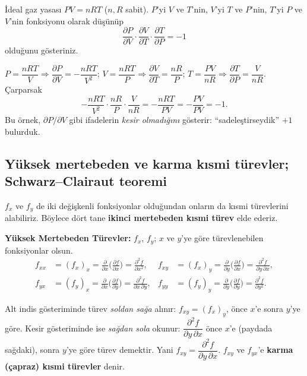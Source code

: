 \begin{soru}
İdeal gaz yasası $PV=nRT$ ($n,R$ sabit). $P$'yi $V$ ve $T$'nin, $V$'yi $T$ ve $P$'nin, $T$'yi $P$ ve $V$'nin fonksiyonu
olarak düşünüp
\[ \frac{\partial P}{\partial V}\cdot\frac{\partial V}{\partial T}\cdot\frac{\partial T}{\partial P}=-1 \]
olduğunu gösteriniz.
\end{soru}
\begin{cevap}
$P=\dfrac{nRT}{V}\Rightarrow \dfrac{\partial P}{\partial V}=-\dfrac{nRT}{V^2}$;\quad
$V=\dfrac{nRT}{P}\Rightarrow \dfrac{\partial V}{\partial T}=\dfrac{nR}{P}$;\quad
$T=\dfrac{PV}{nR}\Rightarrow \dfrac{\partial T}{\partial P}=\dfrac{V}{nR}$. Çarparsak
\[
-\frac{nRT}{V^2}\cdot\frac{nR}{P}\cdot\frac{V}{nR}=-\frac{nRT}{PV}=-\frac{PV}{PV}=-1 .
\]
Bu örnek, $\partial P/\partial V$ gibi ifadelerin \emph{kesir olmadığını} gösterir: ``sadeleştirseydik'' $+1$ bulurduk.
\end{cevap}

\subsection{Yüksek mertebeden ve karma kısmi türevler; Schwarz--Clairaut teoremi}

$f_x$ ve $f_y$ de iki değişkenli fonksiyonlar olduğundan onların da kısmi türevlerini alabiliriz. Böylece dört tane
\textbf{ikinci mertebeden kısmi türev} elde ederiz.

\begin{tahta}
\textbf{Yüksek Mertebeden Türevler:} $f_x$, $f_y$; $x$ ve $y$'ye göre türevlenebilen fonksiyonlar olsun.
\begin{align*}
f_{xx}&=(f_x)_x=\frac{\partial}{\partial x}\Big(\frac{\partial f}{\partial x}\Big)=\frac{\partial^2f}{\partial x^2}, &
f_{xy}&=(f_x)_y=\frac{\partial}{\partial y}\Big(\frac{\partial f}{\partial x}\Big)=\frac{\partial^2f}{\partial y\,\partial x},\\
f_{yx}&=(f_y)_x=\frac{\partial}{\partial x}\Big(\frac{\partial f}{\partial y}\Big)=\frac{\partial^2f}{\partial x\,\partial y}, &
f_{yy}&=(f_y)_y=\frac{\partial}{\partial y}\Big(\frac{\partial f}{\partial y}\Big)=\frac{\partial^2f}{\partial y^2}.
\end{align*}
\end{tahta}

\begin{dikkat}
Alt indis gösteriminde türev \emph{soldan sağa} alınır: $f_{xy}=(f_x)_y$, önce $x$'e sonra $y$'ye göre.
Kesir gösteriminde ise \emph{sağdan sola} okunur: $\dfrac{\partial^2f}{\partial y\,\partial x}$ önce $x$'e (paydada sağdaki),
sonra $y$'ye göre türev demektir. Yani $f_{xy}=\dfrac{\partial^2f}{\partial y\,\partial x}$.
$f_{xy}$ ve $f_{yx}$'e \textbf{karma (çapraz) kısmi türevler} denir.
\end{dikkat}

